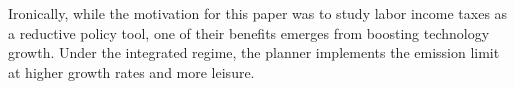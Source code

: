 Ironically, while the motivation for this paper was to study labor income taxes as a reductive policy tool, one of their benefits emerges from boosting technology growth. Under the integrated regime, the planner implements the emission limit at higher growth rates and more leisure. 



